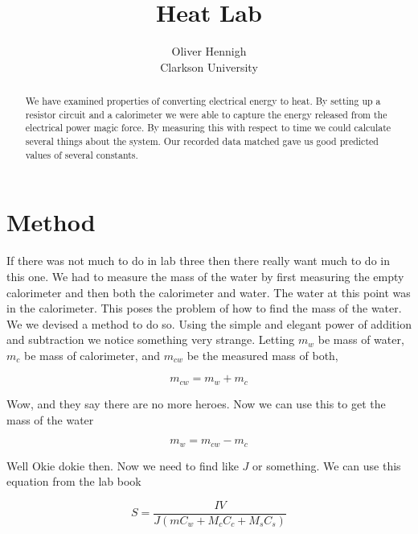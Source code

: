 \documentclass[a4paper,12pt]{article}
\begin{document}
\title{Heat Lab}
\author{Oliver Hennigh \\
Clarkson University}
\renewcommand{\today}{}

\maketitle

\newtheorem*{t1}{Theorem}
\newtheorem*{t3}{Lemma}
\newtheorem*{t2}{Definition}

\begin{abstract}
We have examined properties of converting electrical energy to heat. By setting up a resistor circuit and a calorimeter we were able to capture the energy released from the electrical power magic force. By measuring this with respect to time we could calculate several things about the system. Our recorded data matched gave us good predicted values of several constants.
\end{abstract}


\section{Method}
If there was not much to do in lab three then there really want much to do in this one. We had to measure the mass of the water by first measuring the empty calorimeter and then both the calorimeter and water. The water at this point was in the calorimeter. This poses the problem of how to find the mass of the water. We we devised a method to do so. Using the simple and elegant power of addition and subtraction we notice something very strange. Letting $m_w$ be mass of water, $m_c$ be mass of calorimeter, and $m_{cw}$ be the measured mass of both,

\begin{equation}
	m_{cw} = m_w + m_c
\end{equation}

Wow, and they say there are no more heroes. Now we can use this to get the mass of the water

\begin{equation}
	m_w = m_{cw} - m_c
\end{equation}

Well Okie dokie then. Now we need to find like $J$ or something. We can use this equation from the lab book

\begin{equation}
	S = \frac{IV}{J(mC_w + M_cC_c + M_sC_s)}
\end{equation}
\end{document}
